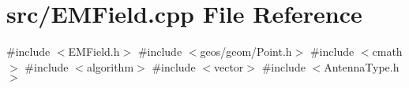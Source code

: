 \section{src/\+E\+M\+Field.cpp File Reference}
\label{_e_m_field_8cpp}
{\ttfamily \#include $<$E\+M\+Field.\+h$>$}\newline
{\ttfamily \#include $<$geos/geom/\+Point.\+h$>$}\newline
{\ttfamily \#include $<$cmath$>$}\newline
{\ttfamily \#include $<$algorithm$>$}\newline
{\ttfamily \#include $<$vector$>$}\newline
{\ttfamily \#include $<$Antenna\+Type.\+h$>$}\newline
